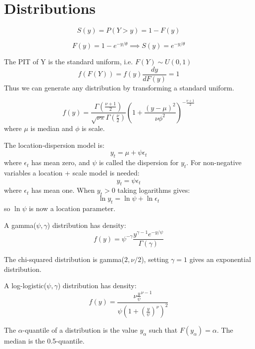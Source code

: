 \documentclass[DIV=14,titlepage=false]{scrreprt}
\begin{document}
\section{Distributions}
\begin{definition}
    \[
        S(y) = P(Y > y) = 1 - F(y)
    \]
\end{definition}
\begin{example}[Exponential]
    \[
        F(y) = 1 - e^{-y/\theta} \implies S(y) = e^{-y/\theta}
    \]
\end{example}
\begin{definition}
The PIT of Y is the standard uniform, i.e. $F(Y) \sim U(0,1)$
\[
    f(F(Y)) = f(y) \frac{dy}{dF(y)} = 1
\]    
Thus we can generate any distribution by transforming a standard uniform.
\end{definition}
\begin{definition}[t-distribution]
    \[
        f(y) = \frac{\Gamma(\frac{\nu+1}{2})}{\sqrt{\nu \pi} \Gamma(\frac{\nu}{2})} \left(1 + \frac{(y-\mu)^2}{\nu \phi^2} \right)^{-\frac{\nu+1}{2}}
    \]    
    where $\mu$ is median and $\phi$ is scale.
\end{definition}
The location-dispersion model is:
\[
    y_t = \mu + \psi \epsilon_t
\]
where $\epsilon_t$ has mean zero, and $\psi$ is called the dispersion for $y_t$. For non-negative variables a location + scale model is needed:
\[
    y_t = \psi \epsilon_t
\]
where $\epsilon_t$ has mean one. When $y_t>0$ taking logarithms gives:
\[
    \ln y_t = \ln \psi + \ln \epsilon_t
\]
so $\ln \psi$ is now a location parameter.
\begin{definition}
    A gamma($\psi, \gamma$) distribution has density:
    \[
        f(y) = \psi^{-\gamma} \frac{y^{\gamma-1}e^{-y/\psi}}{\Gamma(\gamma)}
    \]
\end{definition}
The chi-squared distribution is gamma($2, \nu/2$), setting $\gamma = 1$ gives an exponential distribution.
\begin{definition}
    A log-logistic($\psi, \gamma$) distribution has density:
    \[
        f(y) = \frac{\nu \frac{y}{\psi}^{\nu-1}}{\psi \left(1 + \left(\frac{y}{\psi}\right)^\nu\right)^2}
    \]
\end{definition}
\begin{definition}[Quantiles]
    The $\alpha$-quantile of a distribution is the value $y_\alpha$ such that $F(y_\alpha) = \alpha$. The median is the 0.5-quantile.
\end{definition}
\end{document}
